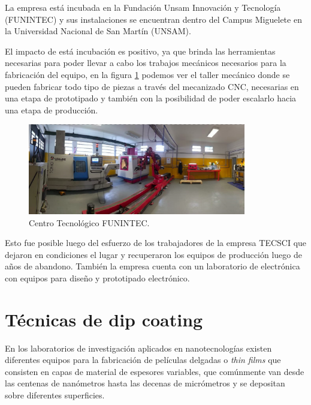 La empresa está incubada en la Fundación Unsam Innovación y Tecnología  (FUNINTEC) y sus instalaciones se encuentran dentro del Campus Miguelete en la Universidad Nacional de San Martín (UNSAM). 

El impacto de está incubación es positivo, ya que brinda las herramientas necesarias para poder llevar a cabo los trabajos mecánicos necesarios para la fabricación del equipo, en la figura \ref{fig:taller} podemos ver el taller mecánico donde se pueden fabricar todo tipo de piezas a través del mecanizado CNC, necesarias en una etapa de prototipado y también con la posibilidad de poder escalarlo hacia una etapa de producción. 

\clearpage
\begin{figure}[htpb]
\centering 
\includegraphics[width=0.85\textwidth]{./Figures/taller_v3.pdf}
\caption{Centro Tecnológico FUNINTEC.}
\label{fig:taller}
\end{figure}


Esto fue posible luego del esfuerzo de los trabajadores de la empresa TECSCI que dejaron en condiciones el lugar y recuperaron los equipos de producción luego de años de abandono.
También la empresa cuenta con un laboratorio de electrónica con equipos para diseño y prototipado electrónico.

\section{Técnicas de dip coating}

En los laboratorios de investigación aplicados en nanotecnologías existen diferentes equipos para la fabricación de películas delgadas o \textit{thin films} que consisten en capas de material de espesores variables, que comúnmente van desde las centenas de nanómetros hasta las decenas de micrómetros y se depositan sobre diferentes superficies.


